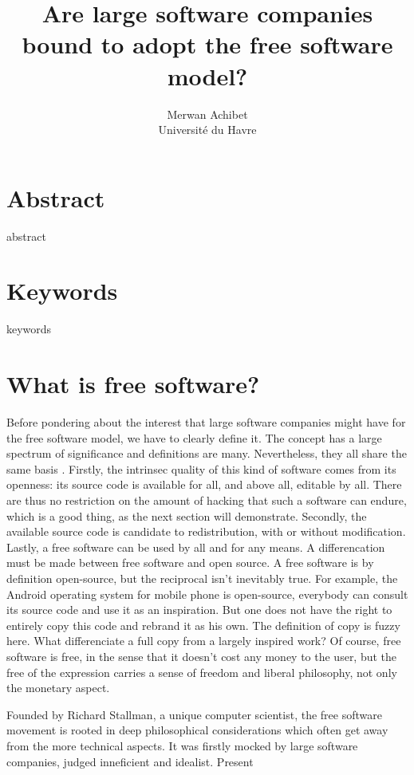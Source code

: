 \documentclass[12pt]{article}
\title{Are large software companies bound to adopt the free software model?}
\author{Merwan Achibet\\Université du Havre}
\date{}
\begin{document}
\maketitle
\newpage

\tableofcontents
\newpage

\section*{Abstract}

abstract

\section*{Keywords}

keywords

\newpage

\section{What is free software?}

Before pondering about the interest that large software companies
might have for the free software model, we have to clearly define
it. The concept has a large spectrum of significance and definitions
are many. Nevertheless, they all share the same basis
\cite{sers}. Firstly, the intrinsec quality of this kind of software
comes from its openness: its source code is available for all, and
above all, editable by all. There are thus no restriction on the
amount of hacking that such a software can endure, which is a good
thing, as the next section will demonstrate. Secondly, the available
source code is candidate to redistribution, with or without
modification. Lastly, a free software can be used by all and for any
means. A differencation must be made between free software and open
source. A free software is by definition open-source, but the
reciprocal isn't inevitably true. For example, the Android operating
system for mobile phone is open-source, everybody can consult its
source code and use it as an inspiration. But one does not have the
right to entirely copy this code and rebrand it as his own. The
definition of copy is fuzzy here. What differenciate a full copy from
a largely inspired work? Of course, free software is free, in the
sense that it doesn't cost any money to the user, but the free of the
expression carries a sense of freedom and liberal philosophy, not only
the monetary aspect.

Founded by Richard Stallman, a unique computer scientist, the free
software movement is rooted in deep philosophical considerations which
often get away from the more technical aspects. It was firstly mocked
by large software companies, judged inneficient and idealist. Present
\end{document}
